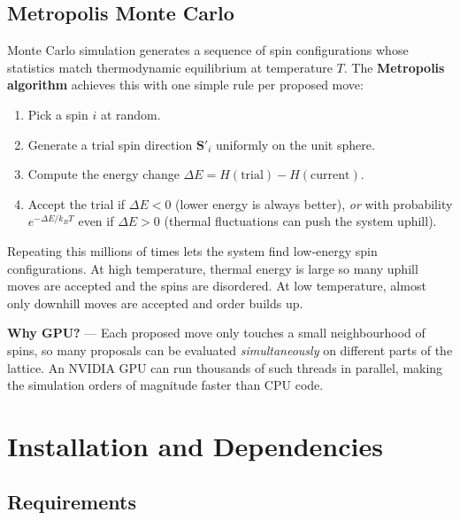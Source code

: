 \documentclass[12pt,a4paper]{article}
\begin{document}
\subsection{Metropolis Monte Carlo}

Monte Carlo simulation generates a sequence of spin configurations whose
statistics match thermodynamic equilibrium at temperature $T$. The
\textbf{Metropolis algorithm} achieves this with one simple rule per
proposed move:

\begin{enumerate}
  \item Pick a spin $i$ at random.
  \item Generate a trial spin direction $\mathbf{S}'_i$ uniformly on the unit sphere.
  \item Compute the energy change $\Delta E = H(\text{trial}) - H(\text{current})$.
  \item Accept the trial if $\Delta E < 0$ (lower energy is always better), \emph{or} with probability $e^{-\Delta E / k_B T}$ even if $\Delta E > 0$ (thermal fluctuations can push the system uphill).
\end{enumerate}

Repeating this millions of times lets the system find low-energy spin
configurations. At high temperature, thermal energy is large so many uphill
moves are accepted and the spins are disordered. At low temperature, almost
only downhill moves are accepted and order builds up.

\begin{notebox}
\textbf{Why GPU?} --- Each proposed move only touches a small neighbourhood of
spins, so many proposals can be evaluated \emph{simultaneously} on different
parts of the lattice. An NVIDIA GPU can run thousands of such threads in
parallel, making the simulation orders of magnitude faster than CPU code.
\end{notebox}

\section{Installation and Dependencies}

\subsection{Requirements}
\end{document}
